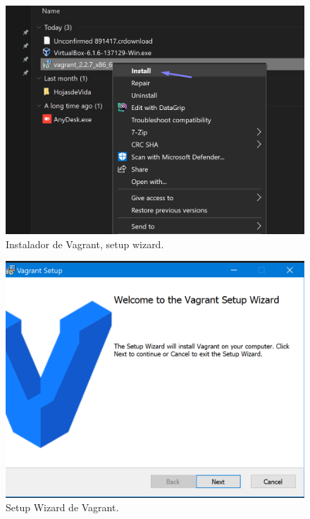 \documentclass[letterpaper, 12pt, oneside]{article}
\begin{document}
    \begin{center}
      \begin{figure}[H]
        \includegraphics[scale=0.9]{img/install/vagrant1.png}
        \caption{Instalador de Vagrant, setup wizard.}
        \label{fig:va1}
    \end{figure}
    
     \begin{figure}[H]
        \includegraphics[scale=0.9]{img/install/vagrant2.png}
        \caption{Setup Wizard de Vagrant. }
        \label{fig:va2}
    \end{figure}     
    \end{center}
 
\end{document}
